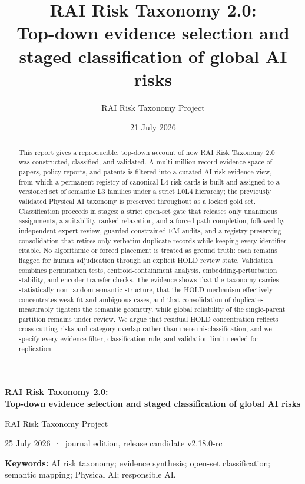 \documentclass[11pt,a4paper]{article}
\title{\vspace{-1.3cm}\bfseries\Large RAI Risk Taxonomy 2.0:\\[3pt]
Top-down evidence selection and staged classification of global AI risks}
\author{RAI Risk Taxonomy Project}
\date{21 July 2026}
\begin{document}
\begin{center}
{\LARGE\bfseries RAI Risk Taxonomy 2.0:\\[2pt]
Top-down evidence selection and staged classification of global AI risks\par}
\vspace{8pt}
{\large RAI Risk Taxonomy Project\par}
\vspace{2pt}
25 July 2026 \,·\, journal edition, release candidate v2.18.0-rc
\end{center}

\begin{abstract}
\noindent
This report gives a reproducible, top-down account of how RAI Risk Taxonomy
2.0 was constructed, classified, and validated. A multi-million-record
evidence space of papers, policy reports, and patents is filtered into a
curated AI-risk evidence view, from which a permanent registry of canonical L4
risk cards is built and assigned to a versioned set of semantic L3 families under
a strict L0\textendash{}L4 hierarchy; the previously validated Physical AI taxonomy is
preserved throughout as a locked gold set. Classification proceeds in stages:
a strict open-set gate that releases only unanimous assignments, a
suitability-ranked relaxation, and a forced-path completion, followed by
independent expert review, guarded constrained-EM audits, and a
registry-preserving consolidation that retires only verbatim duplicate
records while keeping every identifier citable. No algorithmic or forced
placement is treated as ground truth: each remains flagged for human
adjudication through an explicit HOLD review state. Validation combines
permutation tests, centroid-containment analysis, embedding-perturbation
stability, and encoder-transfer checks. The evidence shows that the taxonomy
carries statistically non-random semantic structure, that the HOLD mechanism
effectively concentrates weak-fit and ambiguous cases, and that consolidation
of duplicates measurably tightens the semantic geometry, while global
reliability of the single-parent partition remains under review. We argue
that residual HOLD concentration reflects cross-cutting risks and category
overlap rather than mere misclassification, and we specify every evidence
filter, classification rule, and validation limit needed for replication.
\end{abstract}

\noindent\textbf{Keywords:} AI risk taxonomy; evidence synthesis; open-set
classification; semantic mapping; Physical AI; responsible AI.
\end{document}
